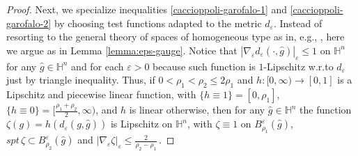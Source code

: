 \documentclass[10pt]{amsart}
\numberwithin{equation}{section}
\theoremstyle{definition}
\newcommand{\He}{\mathbb{H}}
\begin{document}
\begin{proof}
Next, we specialize inequalities \eqref{caccioppoli-garofalo-1} and \eqref{caccioppoli-garofalo-2} by choosing test functions adapted to the metric $d_\varepsilon$. Instead of resorting to the general theory of spaces of homogeneous type as in, e.g., \cite[Section 7]{CapoCitti3}, here we argue as in Lemma \ref{lemma:eps-gauge}. Notice that $|\nabla_\varepsilon d_\varepsilon(\cdot,\hat{g})|_\varepsilon \leq 1$ on $\He^n$ for any $\hat{g} \in \He^n$ and for each $\varepsilon>0$ because such function is $1$-Lipschitz w.r.to $d_\varepsilon$ just by triangle inequality. Thus,  if $0<\rho_1<\rho_2\leq 2 \rho_1$ and $h: [0,\infty) \to [0,1]$ is a Lipschitz and piecewise linear function, with $\{ h \equiv 1\}=[0,\rho_1]$, $\{ h \equiv 0\}=[\frac{\rho_1+\rho_2}2, \infty)$, and $h$ is linear otherwise, then for any $\hat{g} \in \He^n$ the function $\zeta (g)=h (d_\varepsilon(g,\hat{g}))$ is Lipschitz on $\He^n$, with $\zeta \equiv 1$ on $B^\varepsilon_{\rho_1}(\hat{g})$, $spt \,\zeta \subset B^\varepsilon_{\rho_2}(\hat{g})$ and $| \nabla_\varepsilon  \zeta |_\varepsilon \leq \frac{2}{\rho_2-\rho_1} \, $.


\end{proof}
\end{document}
